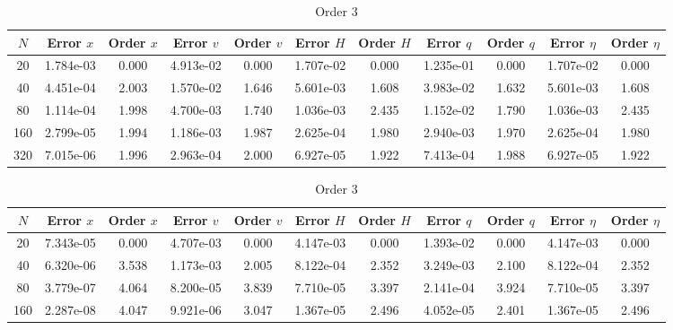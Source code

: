 \documentclass[english]{article}
\theoremstyle{thmstyleone}
\theoremstyle{thmstyletwo}
\theoremstyle{thmstylethree}
\begin{document}
\begin{table}[ht]
	\centering
	\caption{Smooth periodic}
	\label{tab:smooth_periodic}
	\begin{adjustbox}{width=1\textwidth}
		\small
		\begin{subtable}{1.\linewidth}
			\centering
			\caption{Order 2}
			\begin{tabular}{ccccccccccc}
				\toprule
				$N$ & Error $x$ & Order $x$ & Error $v$ & Order $v$ & Error $H$ & Order $H$ & Error $q$ & Order $q$ & Error $\eta$ & Order $\eta$ \\
				\midrule
				20 & 1.784e-03 & 0.000 & 4.913e-02 & 0.000 & 1.707e-02 & 0.000 & 1.235e-01 & 0.000 & 1.707e-02 & 0.000 \\
				40 & 4.451e-04 & 2.003 & 1.570e-02 & 1.646 & 5.601e-03 & 1.608 & 3.983e-02 & 1.632 & 5.601e-03 & 1.608 \\
				80 & 1.114e-04 & 1.998 & 4.700e-03 & 1.740 & 1.036e-03 & 2.435 & 1.152e-02 & 1.790 & 1.036e-03 & 2.435 \\
				160 & 2.799e-05 & 1.994 & 1.186e-03 & 1.987 & 2.625e-04 & 1.980 & 2.940e-03 & 1.970 & 2.625e-04 & 1.980 \\
				320 & 7.015e-06 & 1.996 & 2.963e-04 & 2.000 & 6.927e-05 & 1.922 & 7.413e-04 & 1.988 & 6.927e-05 & 1.922 \\
				\bottomrule
			\end{tabular}
		\end{subtable}
	\end{adjustbox}
	\begin{adjustbox}{width=1\textwidth}
		\small
		\begin{subtable}{1.\linewidth}
			\centering
			\caption{Order 3}
			\begin{tabular}{ccccccccccc}
				\toprule
				$N$ & Error $x$ & Order $x$ & Error $v$ & Order $v$ & Error $H$ & Order $H$ & Error $q$ & Order $q$ & Error $\eta$ & Order $\eta$ \\
				\midrule
				20 & 7.343e-05 & 0.000 & 4.707e-03 & 0.000 & 4.147e-03 & 0.000 & 1.393e-02 & 0.000 & 4.147e-03 & 0.000 \\
				40 & 6.320e-06 & 3.538 & 1.173e-03 & 2.005 & 8.122e-04 & 2.352 & 3.249e-03 & 2.100 & 8.122e-04 & 2.352 \\
				80 & 3.779e-07 & 4.064 & 8.200e-05 & 3.839 & 7.710e-05 & 3.397 & 2.141e-04 & 3.924 & 7.710e-05 & 3.397 \\
				160 & 2.287e-08 & 4.047 & 9.921e-06 & 3.047 & 1.367e-05 & 2.496 & 4.052e-05 & 2.401 & 1.367e-05 & 2.496 \\

\end{tabular}
\end{subtable}
\end{adjustbox}
\end{table}
\end{document}

